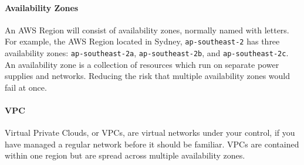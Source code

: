 \documentclass{csse4400}
\begin{document}
\paragraph{Availability Zones}
An AWS Region will consist of availability zones, normally named with letters.
For example, the AWS Region located in Sydney, \texttt{ap-southeast-2} has three availability zones:
\texttt{ap-southeast-2a}, \texttt{ap-southeast-2b}, and \texttt{ap-southeast-2c}.
An availability zone is a collection of resources which run on separate power supplies and networks.
Reducing the risk that multiple availability zones would fail at once.

\paragraph{VPC}
Virtual Private Clouds, or VPCs,
are virtual networks under your control,
if you have managed a regular network before it should be familiar.
VPCs are contained within one region but are spread across multiple availability zones.
\end{document}

